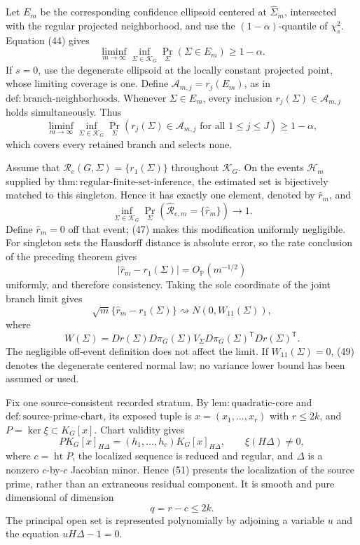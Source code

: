 Let \(E_m\) be the corresponding confidence ellipsoid centered at \(\widehat\Sigma_m\), intersected with the regular projected neighborhood, and use the \((1-\alpha)\)-quantile of \(\chi_s^2\).  Equation (44) gives
\[
 \liminf_{m\to\infty}\inf_{\Sigma\in\mathcal K_G}
 \Pr_\Sigma(\Sigma\in E_m)\geq1-\alpha.
\tag{45}
\]
If \(s=0\), use the degenerate ellipsoid at the locally constant projected point, whose limiting coverage is one.  Define \(\mathcal A_{m,j}=r_j(E_m)\), as in \(\mathrm{def:branch\mbox{-}neighborhoods}\).  Whenever \(\Sigma\in E_m\), every inclusion \(r_j(\Sigma)\in\mathcal A_{m,j}\) holds simultaneously.  Thus
\[
 \liminf_{m\to\infty}\inf_{\Sigma\in\mathcal K_G}
 \Pr_\Sigma\!\left(
 r_j(\Sigma)\in\mathcal A_{m,j}\text{ for all }1\leq j\leq J
 \right)\geq1-\alpha,
\tag{46}
\]
which covers every retained branch and selects none.

Assume that \(\mathcal R_e(G,\Sigma)=\{r_1(\Sigma)\}\) throughout \(\mathcal K_G\).  On the events \(\mathcal H_m\) supplied by \(\mathrm{thm:regular\mbox{-}finite\mbox{-}set\mbox{-}inference}\), the estimated set is bijectively matched to this singleton.  Hence it has exactly one element, denoted by \(\widehat r_m\), and
\[
 \inf_{\Sigma\in\mathcal K_G}\Pr_\Sigma\!\left(
 \widehat{\mathcal R}_{e,m}=\{\widehat r_m\}\right)\longrightarrow1.
\tag{47}
\]
Define \(\widehat r_m=0\) off that event; (47) makes this modification uniformly negligible.  For singleton sets the Hausdorff distance is absolute error, so the rate conclusion of the preceding theorem gives
\[
 |\widehat r_m-r_1(\Sigma)|=O_{\mathbb P}(m^{-1/2})
\tag{48}
\]
uniformly, and therefore consistency.  Taking the sole coordinate of the joint branch limit gives
\[
 \sqrt m\{\widehat r_m-r_1(\Sigma)\}
 \rightsquigarrow N(0,W_{11}(\Sigma)),
\tag{49}
\]
where
\[
 W(\Sigma)=Dr(\Sigma)D\pi_G(\Sigma)V_\Sigma
 D\pi_G(\Sigma)^{\mathsf T}Dr(\Sigma)^{\mathsf T}.
\tag{50}
\]
The negligible off-event definition does not affect the limit.  If \(W_{11}(\Sigma)=0\), (49) denotes the degenerate centered normal law; no variance lower bound has been assumed or used.

Fix one source-consistent recorded stratum.  By \(\mathrm{lem:quadratic\mbox{-}core}\) and \(\mathrm{def:source\mbox{-}prime\mbox{-}chart}\), its exposed tuple is \(x=(x_1,\ldots,x_r)\) with \(r\leq2k\), and \(P=\ker\xi\subset K_G[x]\).  Chart validity gives
\[
 P K_G[x]_{H\Delta}
 =(h_1,\ldots,h_c)K_G[x]_{H\Delta},
 \qquad \xi(H\Delta)\ne0,
\tag{51}
\]
where \(c=\operatorname{ht}P\), the localized sequence is reduced and regular, and \(\Delta\) is a nonzero \(c\)-by-\(c\) Jacobian minor.  Hence (51) presents the localization of the source prime, rather than an extraneous residual component.  It is smooth and pure dimensional of dimension
\[
 q=r-c\leq2k.
\tag{52}
\]
The principal open set is represented polynomially by adjoining a variable \(u\) and the equation \(uH\Delta-1=0\).

